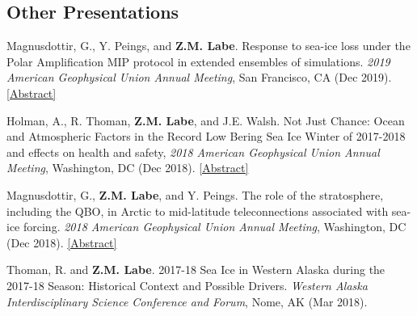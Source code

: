 \documentclass[margin,line,palatino,courier,10pt]{res}
\begin{document}
\begin{resume}
\section{\sc \textcolor{Cerulean}{\large{\textbf{Other Presentations}}}} 
\begin{etaremune}[leftmargin=0in,topsep=0in,parsep=0in]
\item Magnusdottir, G., Y. Peings, and \textbf{Z.M. Labe}. Response to sea-ice loss under the Polar Amplification MIP protocol in extended ensembles of simulations. \textit{2019 American Geophysical Union Annual Meeting}, San Francisco, CA (Dec 2019). \href{https://agu.confex.com/agu/fm19/meetingapp.cgi/Paper/553470}{[Abstract]}
\item Holman, A., R. Thoman, \textbf{Z.M. Labe}, and J.E. Walsh. Not Just Chance: Ocean and Atmospheric Factors in the Record Low Bering Sea Ice Winter of 2017-2018 and effects on health and safety, \textit{2018 American Geophysical Union Annual Meeting}, Washington, DC (Dec 2018). \href{https://agu.confex.com/agu/fm18/meetingapp.cgi/Paper/451295}{[Abstract]}
\item Magnusdottir, G., \textbf{Z.M. Labe}, and Y. Peings. The role of the stratosphere, including the QBO, in Arctic to mid-latitude teleconnections associated with sea-ice forcing. \textit{2018 American Geophysical Union Annual Meeting}, Washington, DC (Dec 2018). \href{https://agu.confex.com/agu/fm18/meetingapp.cgi/Paper/399117}{[Abstract]}
\item Thoman, R. and \textbf{Z.M. Labe}. 2017-18 Sea Ice in Western Alaska during the 2017-18 Season: Historical Context and Possible Drivers. \textit{Western Alaska Interdisciplinary Science Conference and Forum}, Nome, AK (Mar 2018). 

\end{etaremune}

\vspace{-0.1in}
\noindent\textcolor{Cerulean}{\makebox[\linewidth][r]{\rule{\textwidth}{5pt}}}
\vspace{-0.3in}


\end{resume}
\end{document}
